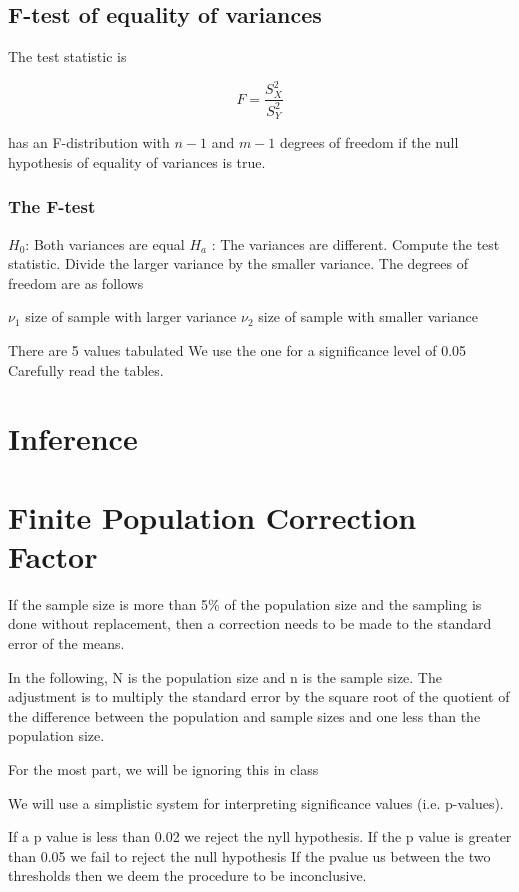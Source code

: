 \subsection{F-test of equality of variances}
The test statistic is

\begin{equation} F = \frac{S_X^2}{S_Y^2}\end{equation}

has an F-distribution with $n-1$ and $m-1$ degrees of freedom if the null hypothesis of equality of variances is true.


\subsubsection{The F-test}
$H_0$: Both variances are equal
$H_a$ : The variances are different.
Compute the test statistic.
Divide the larger variance by the smaller variance.
The degrees of freedom are as follows

$\nu_1$ size of sample with larger variance
$\nu_2$ size of sample with smaller variance

There are 5 values tabulated
We use the one for a significance level of 0.05
Carefully read the tables.
\section{Inference}
	\newpage
	

\section{Finite Population Correction Factor}

If the sample size is more than 5\% of the population size and the sampling is done without replacement, then a correction needs to be made to the standard error of the means.

In the following, N is the population size and n is the sample size. The adjustment is to multiply the standard error by the square root of the quotient of the difference between the population and sample sizes and one less than the population size.  

For the most part, we will be ignoring this in class



We will use a simplistic system for interpreting significance values (i.e. p-values).

If a p value is less than 0.02 we reject the nyll hypothesis.
If the p value is greater than 0.05 we fail to reject the null hypothesis
If the pvalue us between the two thresholds then we deem the procedure to be inconclusive. 

